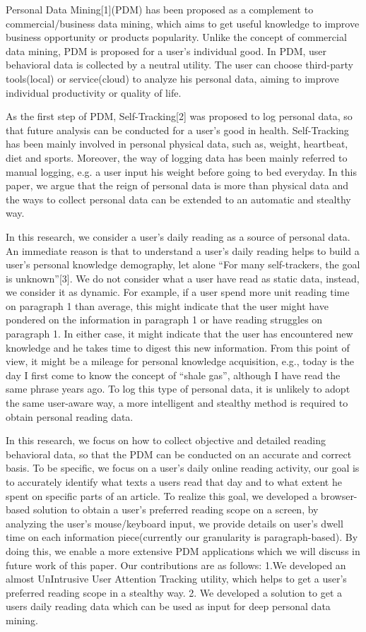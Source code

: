 \documentclass{sigchi}
\begin{document}
Personal Data Mining[1](PDM) has been proposed as a complement to commercial/business data mining, which aims to get useful knowledge to improve business opportunity or products popularity. Unlike the concept of commercial data mining, PDM is proposed for a user’s individual good. In PDM, user behavioral data is collected by a neutral utility. The user can choose third-party tools(local) or service(cloud) to analyze his personal data, aiming to improve individual productivity or quality of life.

 
	As the first step of PDM, Self-Tracking[2] was proposed to log personal data, so that future analysis can be conducted for a user’s good in health. Self-Tracking has been mainly involved in personal physical data, such as, weight, heartbeat, diet and sports. Moreover, the way of logging data has been mainly referred to manual logging, e.g. a user input his weight before going to bed everyday. In this paper, we argue that the reign of personal data is more than physical data and the ways to collect personal data can be extended to an automatic and stealthy way. 


In this research, we consider a user’s daily reading as a source of personal data. An immediate reason is that to understand a user’s daily reading helps to build a user’s personal knowledge demography, let alone “For many self-trackers, the goal is unknown”[3]. We do not consider what a user have read as static data, instead, we consider it as dynamic. For example, if a user spend more unit reading time on  paragraph 1 than average, this might indicate that the user might have pondered on the information in paragraph 1 or have reading struggles on paragraph 1. In either case, it might indicate that the user has encountered new knowledge and he takes time to digest this new information. From this point of view, it might be a mileage for personal knowledge acquisition, e.g., today is the day I first come to know the concept of “shale gas”, although I have read the same phrase years ago. To log this type of personal data, it is unlikely to adopt the same user-aware way, a more intelligent and stealthy method is required to obtain personal reading data. 

In this research, we focus on how to collect objective and detailed reading behavioral data, so that the PDM can be conducted on an accurate and correct basis. To be specific, we focus on a user’s daily online reading activity, our goal is to accurately identify what texts a users read that day and to what extent he spent on specific parts of an article. To realize this goal, we developed a browser-based solution to obtain a user’s preferred reading scope on a screen, by analyzing the user’s mouse/keyboard input, we provide details on user’s dwell time on each information piece(currently our granularity is paragraph-based). By doing this, we enable a more extensive PDM applications which we will discuss in future work of this paper. Our contributions are as follows: 1.We developed an almost UnIntrusive User Attention Tracking utility, which helps to get a user’s preferred reading scope in a stealthy way. 2. We developed  a solution to get a users daily reading data which can be used as input for deep personal data mining. 
\end{document}
